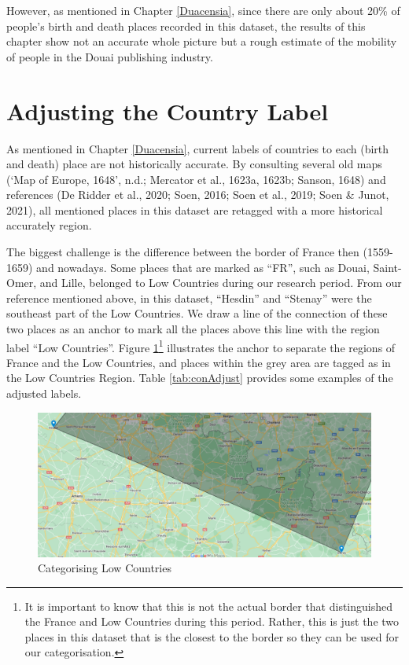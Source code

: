 \documentclass[12pt,a4paper,oneside]{book}
\begin{document}
\begin{sloppypar}
However, as mentioned in Chapter \ref{Duacensia}, since there are only about 20\% of people’s birth and death places recorded in this dataset, the results of this chapter show not an accurate whole picture but a rough estimate of the mobility of people in the Douai publishing industry.

\pagebreak
\section{Adjusting the Country Label}
As mentioned in Chapter \ref{Duacensia}, current labels of countries to each (birth and death) place are not historically accurate. By consulting several old maps (‘Map of Europe, 1648’, n.d.; Mercator et al., 1623a, 1623b; Sanson, 1648) and references (De Ridder et al., 2020; Soen, 2016; Soen et al., 2019; Soen \& Junot, 2021), all mentioned places in this dataset are retagged with a more historical accurately region.

The biggest challenge is the difference between the border of France then (1559-1659) and nowadays. Some places that are marked as “FR”, such as Douai, Saint-Omer, and Lille, belonged to Low Countries during our research period. From our reference mentioned above, in this dataset, “Hesdin” and “Stenay” were the southeast part of the Low Countries. We draw a line of the connection of these two places as an anchor to mark all the places above this line with the region label “Low Countries”. Figure \ref{fig:cateLow}\footnote{It is important to know that this is not the actual border that distinguished the France and Low Countries during this period. Rather, this is just the two places in this dataset that is the closest to the border so they can be used for our categorisation.} illustrates the anchor to separate the regions of France and the Low Countries, and places within the grey area are tagged as in the Low Countries Region. Table \ref{tab:conAdjust} provides some examples of the adjusted labels.

\begin{figure}[H]
\centering
\includegraphics[scale=0.4]{graph/Categorising Low Countries.png}
\caption{Categorising Low Countries}
\label{fig:cateLow}
\end{figure}


\end{sloppypar}
\end{document}
